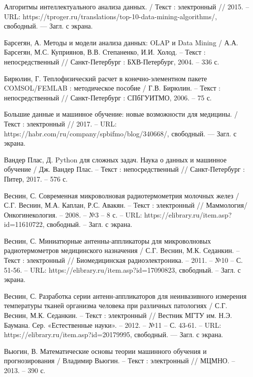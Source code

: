 \begin{thebibliography}{3}
	 Алгоритмы интеллектуального анализа данных. / Текст : электронный // 2015. -- URL: https://tproger.ru/translations/top-10-data-mining-algorithms/, свободный. — Загл. с экрана.
	
	 Барсегян, А. Методы и модели анализа данных: OLAP и Data Mining / А.А. Барсегян, М.С. Куприянов, В.В. Степаненко, И.И. Холод. -- Текст : непосредственный // Санкт-Петербург : 
	БХВ-Петербург, 2004. -- 336 с.
	
	 Бирюлин, Г. Теплофизический расчет в конечно-элементном пакете COMSOL/FEMLAB :  методическое пособие / Г.В. Бирюлин. -- Текст : непосредственный // Санкт-Петербург : СПбГУИТМО, 2006. -- 75 с.
	
	 Большие данные и машинное обучение: новые возможности для медицины. / Текст : электронный // 2017. -- URL: https://habr.com/ru/company/spbifmo/blog/340668/, свободный. — Загл. с экрана.
	
	 Вандер Плас, Д. Python для сложных задач. Наука о данных и машинное обучение / Дж. Вандер Плас. -- Текст : непосредственный // Санкт-Петербург : Питер, 2017. -- 576 с.
	
	 Веснин, С. Современная микроволновая радиотермометрия молочных желез / С.Г. Веснин, М.А. Каплан, Р.С. Авакян. -- Текст : электронный // Маммология/Онкогинекология. -- 2008. -- №3 -- 8 с. -- URL: https://elibrary.ru/item.asp?id=11610722, свободный. -- Загл. с экрана.
	
	 Веснин, С. Миниатюрные антенны-аппликаторы для микроволновых радиотермометров медицинского назначения / С.Г. Веснин, М.К. Седанкин. -- Текст : электронный // Биомедицинская радиоэлектроника. -- 2011. -- №10 -- С. 51-56. -- URL: https://elibrary.ru/item.asp?id=17090823, свободный. -- Загл. с экрана.
	
	 Веснин, С. Разработка серии антенн-аппликаторов для неинвазивного измерения температуры тканей организма человека при различных патологиях / С.Г. Веснин, М.К. Седанкин. -- Текст : электронный // Вестник МГТУ им. Н.Э. Баумана. Сер. «Естественные науки». -- 2012. -- №11 -- С. 43-61. -- URL: https://elibrary.ru/item.asp?id=20179995, свободный. — Загл. с экрана.
	
	 Вьюгин, В. Математические основы теории машинного обучения и прогнозирования / Владимир Вьюгин. -- Текст : электронный // МЦМНО. -- 2013. -- 390 с.
	

\end{thebibliography}
